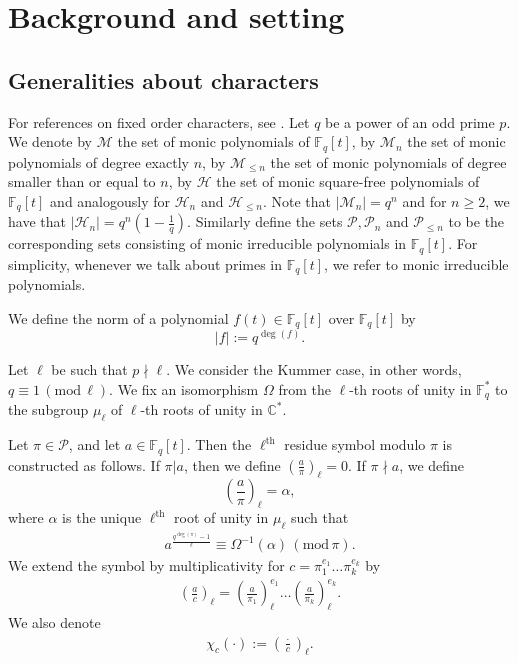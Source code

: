 \documentclass[12pt]{amsart}
\newcommand{\F}{\mathbb{F}}
\newcommand{\C}{\mathbb{C}}
\renewcommand{\pmod}[1]{\,(\mathrm{mod}\,#1)}
\newcommand{\legl}[2]{\left( \frac{#1}{#2} \right)_\ell}
\begin{document}
\section{Background and setting}
\label{background}
\subsection{Generalities about characters} For references on fixed order characters, see \cite{ldlw}. Let $q$ be a power of an odd prime $p$. We denote by $\mathcal{M}$ the set of monic polynomials of $\F_q[t]$, by $\mathcal{M}_{n}$ the set of monic polynomials of degree exactly $n$, by
$\mathcal{M}_{\leq n}$ the set of monic polynomials of degree smaller than or equal to $n$,  
 by $\mathcal{H}$ the set of monic square-free polynomials of $\F_q[t]$ and analogously for
 $\mathcal{H}_{n}$ and $\mathcal{H}_{\leq n}$. Note that $| \mathcal{M}_{n}| = q^n$ and for $n \geq 2$, we have that $| \mathcal{H}_{n}| = q^n (1-\tfrac{1}{q}).$
 Similarly define the sets $\mathcal{P}, \mathcal{P}_{n}$ and $\mathcal{P}_{\leq n}$ to be the corresponding sets consisting of monic irreducible polynomials in $\mathbb{F}_q[t]$. For simplicity, whenever we talk about primes in $\F_q[t]$, we refer to monic irreducible polynomials.


We define the norm of a polynomial $f(t) \in \F_q[t]$ over $\F_q[t]$ by
$$ |f| := q^{\deg(f)}.
$$

Let $\ell$ be such that $p\nmid \ell$.  We consider the Kummer case, in other words, $q\equiv 1 \pmod{\ell}$. We fix  an isomorphism $\Omega$ from the $\ell$-th roots of unity in $\F_{q}^*$ to the subgroup $\mu_\ell$ of $\ell$-th roots of unity in $\C^*$.

Let $\pi \in \mathcal{P}$, and let $a \in \F_q[t]$. Then the $\ell^{\text{th}}$ residue symbol modulo $\pi$ is constructed as follows. If $\pi|a$, then we define $(\frac{a}{\pi})_{\ell}=0$. If $\pi \nmid a$, we define
$$\legl{a}{\pi} =\alpha,$$ where $\alpha $ is the unique $\ell^{\text{th}}$ root of unity in $\mu_{\ell}$ such that
\begin{align*} %
 a^{\frac{q^{\deg(\pi)}-1}{\ell}} \equiv \Omega^{-1}(\alpha) \pmod \pi. \end{align*}
We extend the symbol by multiplicativity for $c=\pi_1^{e_1} \dots \pi_k^{e_k}$ by
\begin{align*}
\legl{a}{c} = \legl{a}{\pi_1}^{e_1} \dots \legl{a}{\pi_k}^{e_k}.
\end{align*}
We also denote
\begin{align} \label{chi-c-notation} 
\chi_c(\cdot) := \legl{\cdot}{c}.\end{align}
\end{document}
